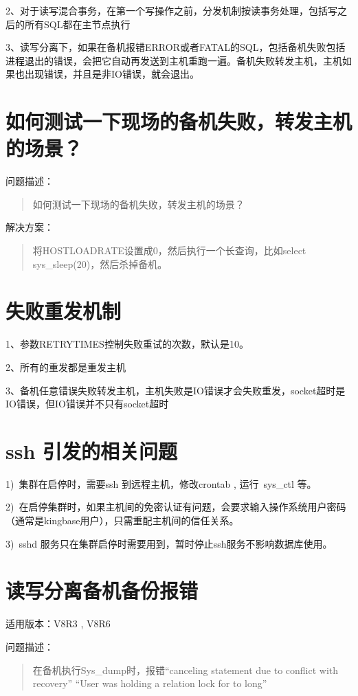 \documentclass[a4,10pt,oneside,english]{sphinxmanual}
\begin{document}
2、对于读写混合事务，在第一个写操作之前，分发机制按读事务处理，包括写之后的所有SQL都在主节点执行

3、读写分离下，如果在备机报错ERROR或者FATAL的SQL，包括备机失败包括进程退出的错误，会把它自动再发送到主机重跑一遍。备机失败转发主机，主机如果也出现错误，并且是非IO错误，就会退出。


\section{如何测试一下现场的备机失败，转发主机的场景？}
\label{\detokenize{high-availability:id3}}
问题描述：
\begin{quote}

如何测试一下现场的备机失败，转发主机的场景？
\end{quote}

解决方案：
\begin{quote}

将HOSTLOADRATE设置成0，然后执行一个长查询，比如select sys\_sleep(20)，然后杀掉备机。
\end{quote}


\section{失败重发机制}
\label{\detokenize{high-availability:id4}}
1、参数RETRYTIMES控制失败重试的次数，默认是10。

2、所有的重发都是重发主机

3、备机任意错误失败转发主机，主机失败是IO错误才会失败重发，socket超时是IO错误，但IO错误并不只有socket超时


\section{ssh 引发的相关问题}
\label{\detokenize{high-availability:ssh}}
1) 集群在启停时，需要ssh 到远程主机，修改crontab , 运行 sys\_ctl 等。

2) 在启停集群时，如果主机间的免密认证有问题，会要求输入操作系统用户密码（通常是kingbase用户），只需重配主机间的信任关系。

3) sshd 服务只在集群启停时需要用到，暂时停止ssh服务不影响数据库使用。


\section{读写分离备机备份报错}
\label{\detokenize{high-availability:id5}}
适用版本：V8R3 , V8R6

问题描述：
\begin{quote}

在备机执行Sys\_dump时，报错“canceling statement due to conflict with recovery” “User was holding a relation lock for to long”
\end{quote}
\end{document}
